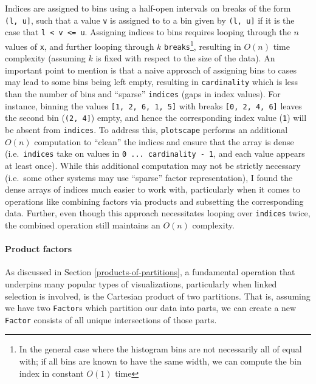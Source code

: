 \documentclass[
  openany]{book}
\theoremstyle{definition}
\theoremstyle{definition}
\theoremstyle{definition}
\theoremstyle{definition}
\theoremstyle{remark}
\begin{document}
Indices are assigned to bins using a half-open intervals on breaks of the form \texttt{(l,\ u{]}}, such that a value \texttt{v} is assigned to to a bin given by \texttt{(l,\ u{]}} if it is the case that \texttt{l\ \textless{}\ v\ \textless{}=\ u}. Assigning indices to bins requires looping through the \(n\) values of \texttt{x}, and further looping through \(k\) \texttt{breaks}\footnote{In the general case where the histogram bins are not necessarily all of equal with; if all bins are known to have the same width, we can compute the bin index in constant \(O(1)\) time}, resulting in \(O(n)\) time complexity (assuming \(k\) is fixed with respect to the size of the data).
An important point to mention is that a naive approach of assigning bins to cases may lead to some bins being left empty, resulting in \texttt{cardinality} which is less than the number of bins and ``sparse'' \texttt{indices} (gaps in index values). For instance, binning the values \texttt{{[}1,\ 2,\ 6,\ 1,\ 5{]}} with breaks \texttt{{[}0,\ 2,\ 4,\ 6{]}} leaves the second bin (\texttt{(2,\ 4{]}}) empty, and hence the corresponding index value (\texttt{1}) will be absent from \texttt{indices}. To address this, \texttt{plotscape} performs an additional \(O(n)\) computation to ``clean'' the indices and ensure that the array is dense (i.e.~\texttt{indices} take on values in \texttt{0\ ...\ cardinality\ -\ 1}, and each value appears at least once). While this additional computation may not be strictly necessary (i.e.~some other systems may use ``sparse'' factor representation), I found the dense arrays of indices much easier to work with, particularly when it comes to operations like combining factors via products and subsetting the corresponding data. Further, even though this approach necessitates looping over \texttt{indices} twice, the combined operation still maintains an \(O(n)\) complexity.

\paragraph{Product factors}\label{product-factors}

As discussed in Section \ref{products-of-partitions}, a fundamental operation that underpins many popular types of visualizations, particularly when linked selection is involved, is the Cartesian product of two partitions. That is, assuming we have two \texttt{Factor}s which partition our data into parts, we can create a new \texttt{Factor} consists of all unique intersections of those parts.
\end{document}
